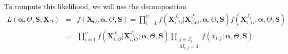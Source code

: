 \documentclass[12pt,a4paper]{report}
\begin{document}
To compute this likelihood, we will use the decomposition
\begin{eqnarray}
	L(\boldsymbol{\alpha},\Theta,\boldsymbol{S};\boldsymbol{X}_O)&=&f(\boldsymbol{X}_{O};\boldsymbol{\alpha},\Theta,\boldsymbol{S})=\prod_{i=1}^nf(\boldsymbol{X}^{J_r}_{i,O}|\boldsymbol{X}^{J_f}_{i,O};\boldsymbol{\alpha},\Theta,\boldsymbol{S})f(\boldsymbol{X}^{J_f}_{i,O};\boldsymbol{\alpha},\Theta,\boldsymbol{S}) \\
	&=&\prod_{i=1}^nf(\boldsymbol{X}^{J_r}_{i,O}|\boldsymbol{X}^{J_f}_{i,O};\boldsymbol{\alpha},\Theta,\boldsymbol{S})\prod_{\substack{j \in J_f \\ M_{i,j}=0}}f(x_{i,j};\boldsymbol{\alpha},\Theta,\boldsymbol{S})
\end{eqnarray}
\end{document}
